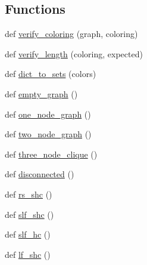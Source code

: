 \subsection*{Functions}
\begin{DoxyCompactItemize}
\item 
def \hyperlink{namespacenetworkx_1_1algorithms_1_1coloring_1_1tests_1_1test__coloring_ab11390c3f9a19e8ba8b85b56e89e2eb0}{verify\+\_\+coloring} (graph, coloring)
\item 
def \hyperlink{namespacenetworkx_1_1algorithms_1_1coloring_1_1tests_1_1test__coloring_ab8a75521f2e97a4b1bdef7c53f68fb3b}{verify\+\_\+length} (coloring, expected)
\item 
def \hyperlink{namespacenetworkx_1_1algorithms_1_1coloring_1_1tests_1_1test__coloring_ac30ea68cc483f802558733d718125d8e}{dict\+\_\+to\+\_\+sets} (colors)
\item 
def \hyperlink{namespacenetworkx_1_1algorithms_1_1coloring_1_1tests_1_1test__coloring_ad608a9cefcf514ff4321d83642377f98}{empty\+\_\+graph} ()
\item 
def \hyperlink{namespacenetworkx_1_1algorithms_1_1coloring_1_1tests_1_1test__coloring_af222681b5c6fafafd5f4b6ed0a00c178}{one\+\_\+node\+\_\+graph} ()
\item 
def \hyperlink{namespacenetworkx_1_1algorithms_1_1coloring_1_1tests_1_1test__coloring_ab5b363ca58039f5d1a3ac2d62ba1ae0d}{two\+\_\+node\+\_\+graph} ()
\item 
def \hyperlink{namespacenetworkx_1_1algorithms_1_1coloring_1_1tests_1_1test__coloring_ae31a1907c1ece32ac307841930951dc2}{three\+\_\+node\+\_\+clique} ()
\item 
def \hyperlink{namespacenetworkx_1_1algorithms_1_1coloring_1_1tests_1_1test__coloring_a424548536fec52163470a3370ffc6a55}{disconnected} ()
\item 
def \hyperlink{namespacenetworkx_1_1algorithms_1_1coloring_1_1tests_1_1test__coloring_adcf5d678b3625a894cc517016987357a}{rs\+\_\+shc} ()
\item 
def \hyperlink{namespacenetworkx_1_1algorithms_1_1coloring_1_1tests_1_1test__coloring_aebf89d2dbbb2588c5f9e496fe8dafbeb}{slf\+\_\+shc} ()
\item 
def \hyperlink{namespacenetworkx_1_1algorithms_1_1coloring_1_1tests_1_1test__coloring_a530eef13c5a4fed36066c4b2b907b7bb}{slf\+\_\+hc} ()
\item 
def \hyperlink{namespacenetworkx_1_1algorithms_1_1coloring_1_1tests_1_1test__coloring_a997ac0afb0e1246936db99bd28beda48}{lf\+\_\+shc} ()
\item 

\end{DoxyCompactItemize}
